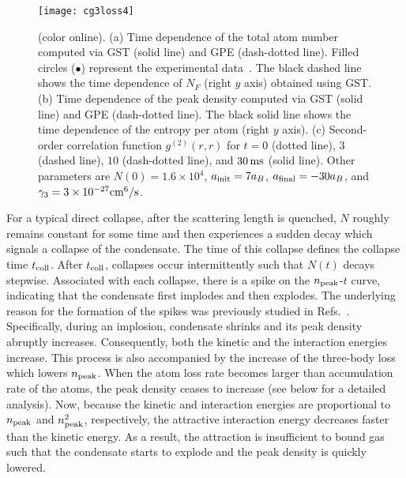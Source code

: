 \documentclass[pra,twocolumn,preprintnumbers,superscriptaddress,longbibliography,showkeys]{revtex4-1}
\begin{document}
\begin{figure}[ptb]
\centering
\texttt{[image: cg3loss4]}
\caption{(color online). (a) Time dependence of the total atom number computed via GST (solid line) and GPE (dash-dotted line). Filled circles ($\bullet$) represent the experimental data~\cite{CllRb2}. The black dashed line shows the time dependence of $N_F$ (right $y$ axis) obtained using GST. (b) Time dependence of the peak density computed via GST (solid line) and GPE (dash-dotted line). The black solid line shows the time dependence of the entropy per atom (right $y$ axis). (c) Second-order correlation function $g^{(2)}(r,r)$ for $t=0$ (dotted line), $3$ (dashed line), $10$ (dash-dotted line), and $30\,{\rm ms}$ (solid line). Other parameters are $N(0)=1.6\times 10^4$, $a_{\rm init}=7a_B$, $a_{\rm final}=-30 a_{B}$, and $\gamma_{3} = 3 \times 10^{-27} {\rm cm}^{6} / {\rm s}$.}
	\label{cg3loss2}
\end{figure}

For a typical direct collapse, after the scattering length is quenched, $N$ roughly remains constant for some time and then experiences a sudden decay which signals a collapse of the condensate. The time of this collapse defines the collapse time $t_{\rm coll}$. After $t_{\rm coll}$, collapses occur intermittently such that $N(t)$ decays stepwise. Associated with each collapse, there is a spike on the $n_{\rm peak}$-$t$ curve, indicating that the condensate first implodes and then explodes. The underlying reason for the formation of the spikes was previously studied in Refs.~\cite{Ueda1,Ueda2}. Specifically, during an implosion, condensate shrinks and its peak density abruptly increases. Consequently, both the kinetic and the interaction energies increase. This process is also accompanied by the increase of the three-body loss which lowers $n_{\rm peak}$. When the atom loss rate becomes larger than accumulation rate of the atoms, the peak density ceases to increase (see below for a detailed analysis). Now, because the kinetic and interaction energies are proportional to $n_{\rm peak}$ and $n_{\rm peak}^2$, respectively, the attractive interaction energy decreases faster than the kinetic energy. As a result, the attraction is insufficient to bound gas such that the condensate starts to explode and the peak density is quickly lowered.
\end{document}
